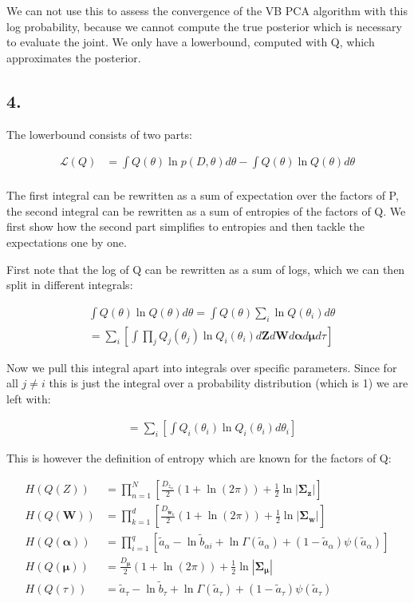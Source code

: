 \documentclass{article}
\def\*#1{\boldsymbol{#1}}
\begin{document}
We can not use this to assess the convergence of the VB PCA algorithm with this log probability, because we cannot compute the true posterior which is necessary to evaluate the joint. We only have a lowerbound, computed with Q, which approximates the posterior.

\subsection*{4.}

The lowerbound consists of two parts:

\begin{align*}
\mathcal{L}(Q) &= \int Q(\theta) \ln p(D, \theta) d\theta - \int Q(\theta) \ln Q(\theta) d\theta \\
\end{align*}

The first integral can be rewritten as a sum of expectation over the factors of P, the second integral can be rewritten as a sum of entropies of the factors of Q. We first show how the second part simplifies to entropies and then tackle the expectations one by one.

First note that the log of Q can be rewritten as a sum of logs, which we can then split in different integrals:

\begin{align*}
& \int Q(\theta) \ln Q(\theta) d\theta = \int Q(\theta) \sum_i \ln Q(\theta_i) d\theta\\
&= \sum_i \left[ \int \prod_j Q_j(\theta_j) \ln Q_i(\theta_i) d\*Z d\*W d\*\alpha d\*\mu d\tau \right]
\end{align*}

Now we pull this integral apart into integrals over specific parameters. Since for all $j \neq i$ this is just the integral over a probability distribution (which is 1) we are left with:

\begin{align*}
&= \sum_i \left[ \int Q_i(\theta_i) \ln Q_i(\theta_i) d\theta_i \right]
\end{align*}

This is however the definition of entropy which are known for the factors of Q:

\begin{align*}
H(Q(Z)) &= \prod_{n=1}^N \left [\frac{D_{z_n}}{2}  (1 + \ln (2\pi)) + \frac{1}{2} \ln |\*\Sigma_{\*z} | \right ] \\
H(Q(\*W)) &= \prod_{k=1}^d \left [ \frac{D_{\tilde{\*w}_k} }{2} (1 + \ln (2\pi)) + \frac{1}{2} \ln |\*\Sigma_{\*w} | \right ] \\
H(Q(\*\alpha)) &= \prod_{i = 1}^q \left [ \tilde{a}_\alpha - \ln \tilde{b}_{\alpha i} + \ln \Gamma(\tilde{a}_\alpha) + (1 - \tilde{a}_\alpha)\psi(\tilde{a}_\alpha) \right ]\\
H(Q(\*\mu)) &= \frac{D_{\*\mu}}{2}  (1 + \ln (2\pi)) + \frac{1}{2} \ln |\*\Sigma_{\*\mu} | \\
H(Q(\tau)) &= \tilde{a}_\tau - \ln \tilde{b}_{\tau} + \ln \Gamma(\tilde{a}_\tau) + (1 - \tilde{a}_\tau)\psi(\tilde{a}_\tau)
\end{align*}
\end{document}
